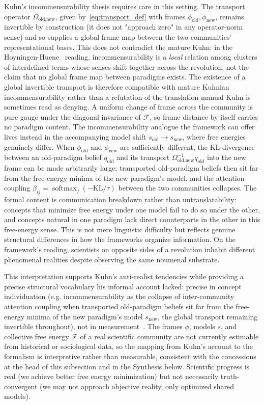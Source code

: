 \documentclass[11pt]{article}
\begin{document}
Kuhn's incommensurability thesis requires care in this setting. The transport operator $\Omega_{\text{old,new}}$, given by~\eqref{eq:transport_def} with frames $\phi_{\text{old}}, \phi_{\text{new}}$, remains invertible by construction (it does not "approach zero" in any operator-norm sense) and so supplies a global frame map between the two communities' representational bases. This does not contradict the mature Kuhn: in the Hoyningen-Huene~\cite{Hoyningen-Huene1993} reading, incommensurability is a \emph{local} relation among clusters of interdefined terms whose senses shift together across the revolution, not the claim that no global frame map between paradigms exists. The existence of a global invertible transport is therefore compatible with mature Kuhnian incommensurability rather than a refutation of the translation manual Kuhn is sometimes read as denying. A uniform change of frame across the community is pure gauge under the diagonal invariance of $\mathcal{F}$, so frame distance by itself carries no paradigm content. The incommensurability analogue the framework can offer lives instead in the accompanying model shift $s_{\text{old}} \to s_{\text{new}}$, where free energies genuinely differ. When $\phi_{\text{old}}$ and $\phi_{\text{new}}$ are sufficiently different, the KL divergence between an old-paradigm belief $q_{\text{old}}$ and its transport $\Omega_{\text{old,new}}^{-1} q_{\text{old}}$ into the new frame can be made arbitrarily large; transported old-paradigm beliefs then sit far from the free-energy minima of the new paradigm's model, and the attention coupling $\beta_{ij} = \operatorname{softmax}_j(-\mathrm{KL}/\tau)$ between the two communities collapses. The formal content is communication breakdown rather than untranslatability: concepts that minimize free energy under one model fail to do so under the other, and concepts natural in one paradigm lack direct counterparts in the other in this free-energy sense. This is not mere linguistic difficulty but reflects genuine structural differences in how the frameworks organize information. On the framework's reading, scientists on opposite sides of a revolution inhabit different phenomenal realities despite observing the same noumenal substrate.

This interpretation supports Kuhn's anti-realist tendencies while providing a precise structural vocabulary his informal account lacked: precise in concept individuation (e.g. incommensurability as the collapse of inter-community attention coupling when transported old-paradigm beliefs sit far from the free-energy minima of the new paradigm's model $s_{\mathrm{new}}$, the global transport remaining invertible throughout), not in measurement~\cite{Hoyningen-Huene1993}. The frames $\phi$, models $s$, and collective free energy $\mathcal{F}$ of a real scientific community are not currently estimable from historical or sociological data, so the mapping from Kuhn's account to the formalism is interpretive rather than measurable, consistent with the concessions at the head of this subsection and in the Synthesis below. Scientific progress is real (we achieve better free energy minimization) but not necessarily truth-convergent (we may not approach objective reality, only optimized shared models).
\end{document}

